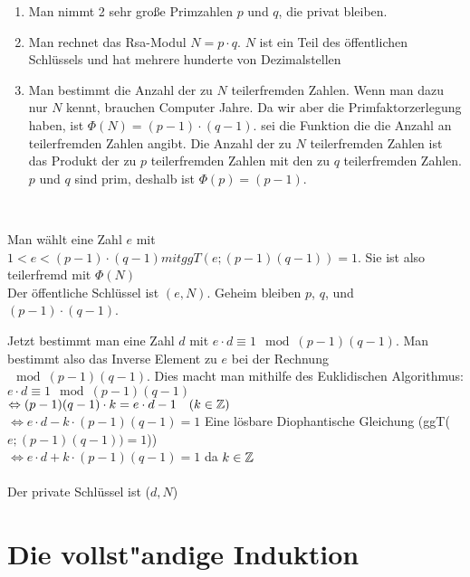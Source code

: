 
\begin{enumerate}
\item Man nimmt 2 sehr große Primzahlen $p$ und $q$, die privat bleiben.\\
\item Man rechnet das Rsa-Modul $N=p \cdot q$. $N$ ist ein Teil des öffentlichen Schlüssels und hat mehrere hunderte von Dezimalstellen\\
\item Man bestimmt die Anzahl der zu $N$ teilerfremden Zahlen. Wenn man dazu nur $N$ kennt, brauchen Computer Jahre. Da wir aber die Primfaktorzerlegung haben, ist $\Phi(N) = (p - 1) \cdot (q - 1)$. \Phi sei die Funktion die die Anzahl an teilerfremden Zahlen angibt. Die Anzahl der zu $N$ teilerfremden Zahlen ist das Produkt der zu $p$ teilerfremden Zahlen mit den zu $q$ teilerfremden Zahlen. $p$ und $q$ sind prim, deshalb ist $\Phi(p)=(p - 1)$.
\end{enumerate}\\
\item Man wählt eine Zahl $e$ mit $1<e<(p-1)\cdot(q-1) mit ggT(e;(p-1)(q-1)) = 1$. Sie ist also teilerfremd mit $\Phi(N)$\\
Der öffentliche Schlüssel ist $(e,N)$. Geheim bleiben $p$, $q$, und $(p - 1) \cdot (q-1)$.
\item Jetzt bestimmt man eine Zahl $d$ mit $e \cdot d \equiv 1 \mod (p-1)(q-1)$. Man bestimmt also das Inverse Element zu $e$ bei der Rechnung $\mod (p-1)(q-1)$. Dies macht man mithilfe des Euklidischen Algorithmus:\\
$e \cdot d \equiv 1 \mod (p-1)(q-1) $\\
$\Leftrightarrow (p-1)(q-1) \cdot k = e \cdot d -1 \quad (k \in \mathbb{Z})$\\
$\Leftrightarrow e \cdot d - k \cdot (p-1)(q-1) = 1$ \quad Eine lösbare Diophantische Gleichung (ggT($e;(p-1)(q-1)) = 1$))\\
$\Leftrightarrow e \cdot d + k \cdot (p-1)(q-1) = 1$ \quad da $k \in \mathbb{Z}$\\\\
Der private Schlüssel ist ($d,N$)





	\section{Die vollst"andige Induktion}


